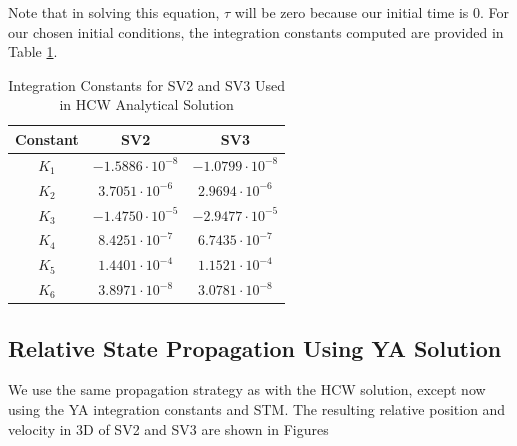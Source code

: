Note that in solving this equation, $\tau$ will be zero because our initial time is 0. For our chosen initial conditions, the integration constants computed are provided in Table \ref{tab:integration_constants_HCW}.

\begin{table}[ht]
    \centering
    \renewcommand{\arraystretch}{1.2}
    \begin{tabular}{c c c}
        \toprule
        \textbf{Constant} & \textbf{SV2} & \textbf{SV3} \\
        \midrule
        $K_1$ & $-1.5886\cdot10^{-8}$ & $-1.0799\cdot10^{-8}$ \\
        $K_2$ & $3.7051\cdot10^{-6}$ & $2.9694\cdot10^{-6}$ \\
        $K_3$ & $-1.4750\cdot10^{-5}$& $-2.9477\cdot10^{-5}$\\
        $K_4$ & $8.4251\cdot10^{-7}$ & $6.7435\cdot10^{-7}$ \\
        $K_5$ & $1.4401\cdot10^{-4}$ & $1.1521\cdot10^{-4}$ \\
        $K_6$ & $3.8971\cdot10^{-8}$ & $3.0781\cdot10^{-8}$ \\
        \bottomrule
    \end{tabular}
    \caption{Integration Constants for SV2 and SV3 Used in HCW Analytical Solution}
    \label{tab:integration_constants_HCW}
\end{table}

\subsection{Relative State Propagation Using YA Solution}
We use the same propagation strategy as with the HCW solution, except now using the YA integration constants and STM. The resulting relative position and velocity in 3D of SV2 and SV3 are shown in Figures 


